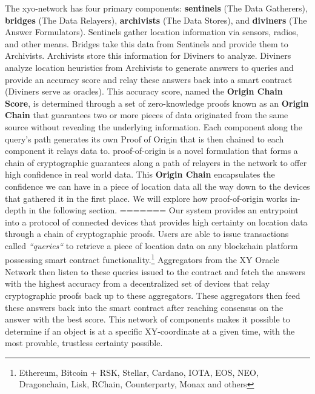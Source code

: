 \documentclass{article}
\begin{document}
The \Gls{xyo-network} has four primary components: \textbf{\Glspl{sentinel}} (The Data Gatherers), \textbf{\Glspl{bridge}} (The Data Relayers), \textbf{\Glspl{archivist}} (The Data Stores), and \textbf{\Glspl{diviner}} (The Answer Formulators). Sentinels gather location information via sensors, radios, and other means. Bridges take this data from Sentinels and provide them to Archivists. Archivists store this information for Diviners to analyze. Diviners analyze location heuristics from Archivists to generate answers to queries and provide an accuracy score and relay these answers back into a smart contract (Diviners serve as oracles). This accuracy score, named the \textbf{Origin Chain Score}, is determined through a set of zero-knowledge proofs known as an \textbf{Origin Chain} that guarantees two or more pieces of data originated from the same source without revealing the underlying information. Each component along the query's path generates its own Proof of Origin that is then chained to each component it relays data to. \Gls{proof-of-origin} is a novel formulation that forms a chain of cryptographic guarantees along a path of relayers in the network to offer high confidence in real world data. This \textbf{Origin Chain} encapsulates the confidence we can have in a piece of location data all the way down to the devices that gathered it in the first place. We will explore how \Gls{proof-of-origin} works in-depth in the following section.
=======
Our system provides an entrypoint into a protocol of connected devices that provides high certainty on location data through a chain of cryptographic proofs. Users are able to issue transactions called \textit{``queries``} to retrieve a piece of location data on any blockchain platform possessing smart contract functionality.\footnote{Ethereum, Bitcoin + RSK, Stellar, Cardano, IOTA, EOS, NEO, Dragonchain, Lisk, RChain, Counterparty, Monax and others} Aggregators from the XY Oracle Network then listen to these queries issued to the contract and fetch the answers with the highest accuracy from a decentralized set of devices that relay cryptographic proofs back up to these aggregators. These aggregators then feed these answers back into the smart contract after reaching consensus on the answer with the best score. This network of components makes it possible to determine if an object is at a specific XY-coordinate at a given time, with the most provable, trustless certainty possible.
\end{document}
